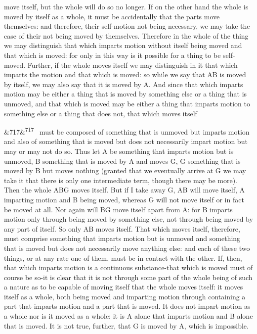 \documentclass[12pt]{article}
\newcommand{\para}[1][]{\par\noindent\ifx&#1&\else\textsuperscript{\footnotesize #1}~\fi}
\begin{document}
move itself, but the whole will do so no longer. If on the other hand the whole is moved by itself as a whole, it must be accidentally that the parts move themselves: and therefore, their self-motion not being necessary, we may take the case of their not being moved by themselves. Therefore in the whole of the thing we may distinguish that which imparts motion without itself being moved and that which is moved: for only in this way is it possible for a thing to be self-moved. Further, if the whole moves itself we may distinguish in it that which imparts the motion and that which is moved: so while we say that AB is moved by itself, we may also say that it is moved by A. And since that which imparts motion may be either a thing that is moved by something else or a thing that is unmoved, and that which is moved may be either a thing that imparts motion to something else or a thing that does not, that which moves itself

\para[717] must be composed of something that is unmoved but imparts motion and also of something that is moved but does not necessarily impart motion but may or may not do so. Thus let A be something that imparts motion but is unmoved, B something that is moved by A and moves G, G something that is moved by B but moves nothing (granted that we eventually arrive at G we may take it that there is only one intermediate term, though there may be more). Then the whole ABG moves itself. But if I take away G, AB will move itself, A imparting motion and B being moved, whereas G will not move itself or in fact be moved at all. Nor again will BG move itself apart from A: for B imparts motion only through being moved by something else, not through being moved by any part of itself. So only AB moves itself. That which moves itself, therefore, must comprise something that imparts motion but is unmoved and something that is moved but does not necessarily move anything else: and each of these two things, or at any rate one of them, must be in contact with the other. If, then, that which imparts motion is a continuous substance-that which is moved must of course be so-it is clear that it is not through some part of the whole being of such a nature as to be capable of moving itself that the whole moves itself: it moves itself as a whole, both being moved and imparting motion through containing a part that imparts motion and a part that is moved. It does not impart motion as a whole nor is it moved as a whole: it is A alone that imparts motion and B alone that is moved. It is not true, further, that G is moved by A, which is impossible.
\end{document}
